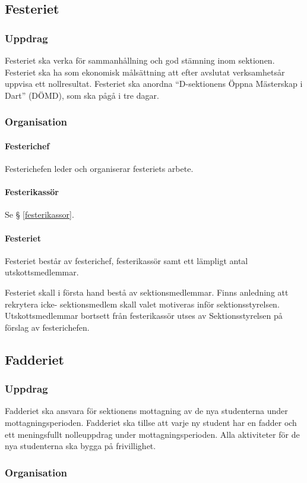 \documentclass{datateknologsektionen-document}
\begin{document}
\subsection{Festeriet}
\label{festeriet}
\subsubsection{Uppdrag}
Festeriet ska verka för sammanhållning och god stämning inom sektionen. Festeriet ska ha som
ekonomisk målsättning att efter avslutat verksamhetsår uppvisa ett nollresultat. Festeriet ska
anordna ``D-sektionens Öppna Mästerskap i Dart'' (DÖMD), som ska pågå i tre dagar.
\subsubsection{Organisation}
\paragraph{Festerichef}
Festerichefen leder och organiserar festeriets arbete.
\paragraph{Festerikassör}
Se § \ref{festerikassor}.
\paragraph{Festeriet}
Festeriet består av festerichef, festerikassör samt ett lämpligt antal utskottsmedlemmar.

Festeriet skall i första hand bestå av sektionsmedlemmar. Finns anledning att rekrytera icke-
sektionsmedlem skall valet motiveras inför sektionsstyrelsen. Utskottsmedlemmar bortsett
från festerikassör utses av Sektionsstyrelsen på förslag av festerichefen.
\subsection{Fadderiet}
\label{fadderiet}
\subsubsection{Uppdrag}
Fadderiet ska ansvara för sektionens mottagning av de nya studenterna under
mottagningsperioden. Fadderiet ska tillse att varje ny student har en fadder och ett meningsfullt
nolleuppdrag under mottagningsperioden. Alla aktiviteter för de nya studenterna ska bygga på
frivillighet.
\subsubsection{Organisation}
\end{document}

